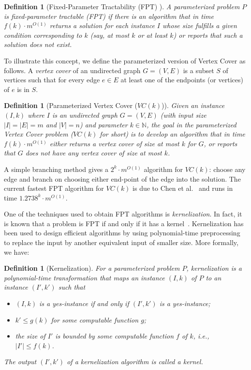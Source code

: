 \documentclass[11pt,letter]{article}
\newtheorem{definition}[theorem]{Definition}
\newcommand{\NAT}{\ensuremath{\mathbb{N}}}
\newcommand{\NATURAL}{\NAT}
\begin{document}
\begin{definition}[Fixed-Parameter Tractability (FPT) ]
\label{def:fpt}
A parameterized problem $P$ is \emph{fixed-parameter tractable} (FPT) if there is an algorithm
that in time $f(k)\cdot m^{O(1)}$ returns a solution for each instance $I$ whose  size
fulfills a given condition corresponding to $k$ (say, at most  $k$ or at least $k$)
or reports that such a solution does not exist.
\end{definition}






To illustrate this concept,
we define the parameterized version of Vertex Cover as follows.
A \textit{vertex cover} of an undirected graph $G=(V,E)$ is a subset $S$
of vertices such that for every edge $e\in E$ at least one
of the endpoints (or vertices) of $e$ is in $S$.



\begin{definition}[Parameterized Vertex Cover ($VC(k)$)]
\label{def:vc}
Given an instance $(I,k)$ where $I$ is an undirected graph $G=(V,E)$ (with input size
$|I|=|E|=m$ and $|V|=n$) and parameter $k\in \NATURAL$,  the goal in the
\textit{parameterized Vertex Cover} problem ($VC(k)$  for short)
is to develop an algorithm that in time $f(k)\cdot m^{O(1)}$ either returns
a vertex cover of size at most $k$ for $G$, or reports that $G$ does not have
any vertex cover of size at most $k$.
\end{definition}

A simple branching method gives a $2^{k}\cdot m^{O(1)}$ algorithm for $VC(k)$:
choose any edge and branch on choosing either end-point of the edge into the solution.
The current fastest FPT algorithm for $VC(k)$ is due to
Chen et al.~\cite{kanj-vc} and runs in time $1.2738^{k}\cdot m^{O(1)}$.






One of the techniques used to obtain FPT algorithms is
\textit{kernelization}. In fact, it is known that a problem is FPT if
and only if it has a kernel~\cite{FG06}.
Kernelization has been used to design efficient algorithms by using polynomial-time
preprocessing to replace the input by another equivalent input of smaller size. More formally, we have:

\begin{definition}[Kernelization]
\label{def:kernel}
For a parameterized problem $P$, kernelization is a polynomial-time transformation
that maps an instance $(I,k)$ of $P$ to an instance $(I',k')$ such that
\begin{itemize}
\item $(I,k)$ is a yes-instance if and only if $(I',k')$ is a yes-instance;
\item $k'\le g(k)$ for some computable function $g$;
\item the size of $I'$  is bounded by some computable function $f$ of $k$, i.e., $|I'|\le f(k)$.
\end{itemize}
The output $(I',k')$ of a kernelization algorithm is called a \textit{kernel}.
\end{definition}
\end{document}
